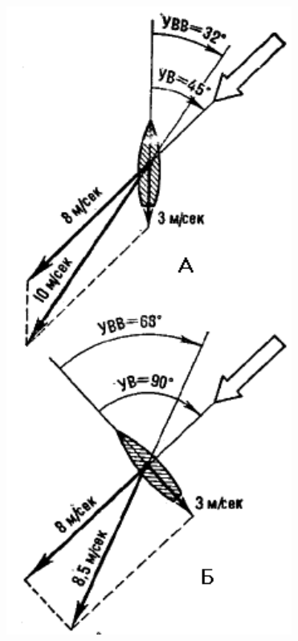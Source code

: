 \documentclass[a4paper, 12pt, twoside, final]{scrbook}
\begin{document}
\begin{figure}[htbp]
	\begin{minipage}[c]{0.49\textwidth}
		\centering\includegraphics[scale=1]{90_1_Vympelnyj_veter}
	\end{minipage}
	\hfil\hfil%
	\begin{minipage}[c]{0.49\textwidth}

\end{minipage}
\end{figure}
\end{document}
